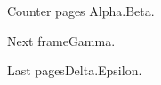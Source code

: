 \documentclass{beamer}
\date{}
\begin{document}
\begin{frame}[allowframebreaks]{Counter pages}
Alpha.\newpage Beta.
\end{frame}
\begin{frame}{Next frame}Gamma.\end{frame}
\begin{frame}[allowframebreaks]{Last pages}Delta.\newpage Epsilon.\end{frame}
\end{document}
